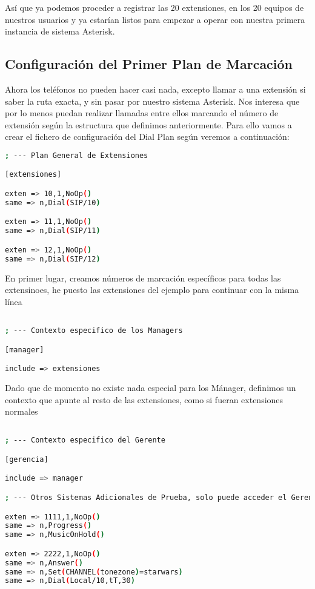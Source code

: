 Así que ya podemos proceder a registrar las 20 extensiones, en los 20 equipos de nuestros usuarios y ya estarían listos para empezar a operar con nuestra primera instancia de sistema Asterisk.

\newpage

\subsection{Configuración del Primer Plan de Marcación}

Ahora los teléfonos no pueden hacer casi nada, excepto llamar a una extensión si saber la ruta exacta, y sin pasar por nuestro sistema Asterisk. Nos interesa que por lo menos puedan realizar llamadas entre ellos marcando el número de extensión según la estructura que definimos anteriormente. Para ello vamos a crear el fichero de configuración del Dial Plan según veremos a continuación:

\begin{lstlisting}[language=bash,title={/etc/asterisk/extensions.conf}]
; --- Plan General de Extensiones

[extensiones]

exten => 10,1,NoOp()
same => n,Dial(SIP/10)

exten => 11,1,NoOp()
same => n,Dial(SIP/11)

exten => 12,1,NoOp()
same => n,Dial(SIP/12)

\end{lstlisting}

En primer lugar, creamos números de marcación específicos para todas las extensinoes, he puesto las extensiones del ejemplo para continuar con la misma línea

\begin{lstlisting}[language=bash,title={/etc/asterisk/extensions.conf}]

; --- Contexto especifico de los Managers

[manager]

include => extensiones

\end{lstlisting}

Dado que de momento no existe nada especial para los Mánager, definimos un contexto que apunte al resto de las extensiones, como si fueran extensiones normales

\begin{lstlisting}[language=bash,title={/etc/asterisk/extensions.conf}]

; --- Contexto especifico del Gerente

[gerencia]

include => manager

; --- Otros Sistemas Adicionales de Prueba, solo puede acceder el Gerente.

exten => 1111,1,NoOp()
same => n,Progress()
same => n,MusicOnHold()

exten => 2222,1,NoOp()
same => n,Answer()
same => n,Set(CHANNEL(tonezone)=starwars)
same => n,Dial(Local/10,tT,30)

\end{lstlisting}


